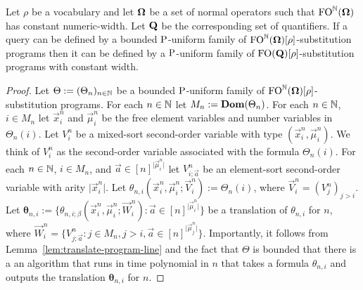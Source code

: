 \documentclass[../main/thesis.tex]{subfiles}
\begin{document}
\begin{lem}
  Let $\rho$ be a vocabulary and let $\mathbf{\mathbf{\Omega}}$ be a set of normal operators such
  that $\text{\upshape FO}^{\mathbb{N}}(\mathbf{\mathbf{\Omega}})$ has constant numeric-width. Let $\mathbf{Q}$ be the
  corresponding set of quantifiers. If a query can be defined by a bounded
  $\mathrm{P}$-uniform family of $\text{\upshape FO}^{\mathbb{N}} (\mathbf{\mathbf{\Omega}})[\rho]$-substitution programs
  then it can be defined by a $\mathrm{P}$-uniform family of $\text{\upshape FO}
  (\mathbf{Q})[\rho]$-substitution programs with constant width.
  \label{lem:translate-sub-operators-to-queries}
\end{lem}
\begin{proof}
  Let $\Theta := (\Theta_{n})_{n \in \mathbb{N}}$ be a bounded $\mathrm{P}$-uniform family
  of $\text{\upshape FO}^{\mathbb{N}}(\mathbf{\mathbf{\Omega}})[\rho]$-substitution programs. For each $n \in \mathbb{N}$
  let $M_n := \text{\textbf{Dom}}(\Theta_n)$. For each $n \in \mathbb{N}$, $i \in M_n$ let
  $\vec{x}^n_i$ and $\vec{\mu}^n_i$ be the free element variables and number
  variables in $\Theta_n(i)$. Let $V^n_i$ be a mixed-sort second-order variable
  with type $(\vec{x}^n_i, \vec{\mu}^n_i)$. We think of $V^n_i$ as the
  second-order variable associated with the formula $\Theta_n(i)$. For each $n
  \in \mathbb{N}$, $i \in M_n$, and $\vec{a} \in [n]^{\vert \vec{\mu}^n_i \vert}$ let
  $V^n_{i ; \vec{a}}$ be an element-sort second-order variable with arity $\vert
  \vec{x}^n_i\vert$. Let $\theta_{n, i}(\vec{x}^n_i, \vec{\mu}^n_i; \vec{V}^n_i)
  := \Theta_n(i)$, where $\vec{V}^n_i = (V^n_j)_{j > i}$. Let
  $\boldsymbol{\theta}_{n, i} := \{\theta_{n, i; \beta} (\vec{x}^n_i
  ,\vec{\mu}^n_i ; \vec{W}^n_{i}) : \vec{a} \in [n]^{\vert \vec{\mu}^n_i
    \vert}\}$ be a translation of $\theta_{n, i}$ for $n$, where $\vec{W}^n_i =
  \{V^{n}_{j; \vec{a}} : j \in M_n, j > i, \vec{a} \in [n]^{\vert \vec{\mu}^n_j
    \vert}\}$. Importantly, it follows from
  Lemma~\ref{lem:translate-program-line} and the fact that $\Theta$ is bounded
  that there is a an algorithm that runs in time polynomial in $n$ that takes a
  formula $\theta_{n, i}$ and outputs the translation $\boldsymbol{\theta}_{n,
    i}$ for $n$.


\end{proof}
\end{document}
